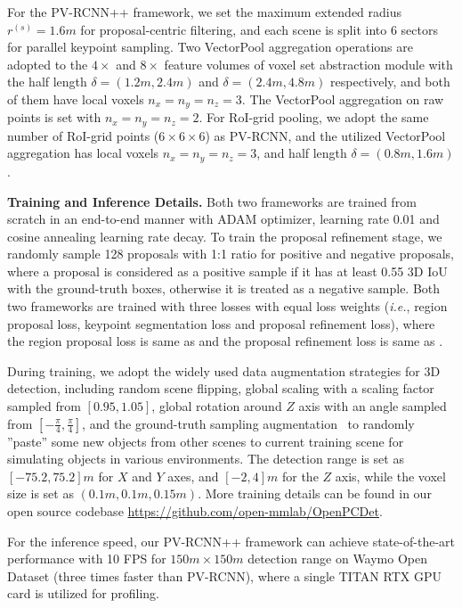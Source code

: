 \documentclass[natbib,twocolumn]{svjour3}          \smartqed  \usepackage{graphicx}
\begin{document}
For the PV-RCNN++ framework, we set the maximum extended radius $r^{(s)}=1.6m$ for proposal-centric filtering, and each scene is split into 6 sectors for parallel keypoint sampling. 
Two VectorPool aggregation operations are adopted to the $4\times$ and $8\times$ feature volumes of voxel set abstraction module with the half length $\delta=(1.2m, 2.4m)$ and $\delta=(2.4m, 4.8m)$ respectively, and both of them have local voxels $n_x=n_y=n_z=3$.  
The VectorPool aggregation on raw points is set with $n_x=n_y=n_z=2$. 
For RoI-grid pooling, we adopt the same number of RoI-grid points ($6\times 6\times 6$) as PV-RCNN, and the utilized VectorPool aggregation has local voxels $n_x=n_y=n_z=3$, 
and half length $\delta=(0.8m, 1.6m)$. 



\noindent
\textbf{Training and Inference Details.}
Both two frameworks are trained from scratch in an end-to-end manner with ADAM optimizer, learning rate 0.01 and cosine annealing learning rate decay. To train the proposal refinement stage, we randomly sample 128 proposals with 1:1 ratio for positive and negative proposals, where a proposal is considered as a positive sample if it has at least 0.55 3D IoU with the ground-truth boxes, otherwise it is treated as a negative sample. 
Both two frameworks are trained with three losses with equal loss weights (\emph{i.e.},
region proposal loss, keypoint segmentation loss and proposal refinement loss), where the region proposal loss is same as \citep{yin2021center} and the proposal refinement loss is same as \citep{shi2020part}.


During training, we adopt the widely used data augmentation strategies for 3D detection, including random scene flipping, global scaling with a scaling factor sampled from $[0.95, 1.05]$, global rotation around $Z$ axis with an angle sampled from $[-\frac{\pi}{4}, \frac{\pi}{4}]$, and the ground-truth sampling augmentation~\citep{yan2018second} to randomly ''paste'' some new objects from other scenes to current training scene for simulating objects in various environments.
The detection range is set as $[-75.2, 75.2]m$ for $X$ and $Y$ axes, and $[-2, 4]m$ for the $Z$ axis, while the voxel size is set as $(0.1m, 0.1m, 0.15m)$. 
More training details can be found in our open source codebase \url{https://github.com/open-mmlab/OpenPCDet}.

For the inference speed, our PV-RCNN++ framework can achieve state-of-the-art performance with 10 FPS for $150m \times 150m$ detection range on Waymo Open Dataset (three times faster than PV-RCNN), where a single TITAN RTX GPU card is utilized for profiling.
\end{document}
